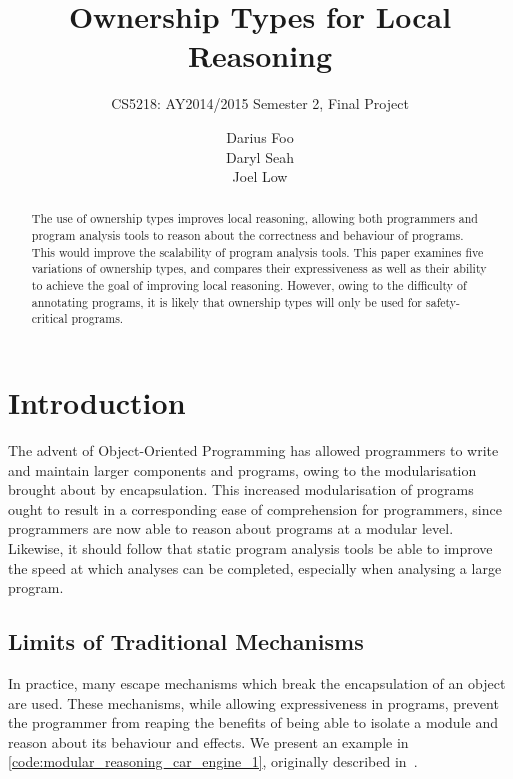 \documentclass{acm_proc_article-sp}
\begin{document}
\title{Ownership Types for Local Reasoning}
\subtitle{CS5218: AY2014/2015 Semester 2, Final Project}


\author{
\alignauthor
Darius Foo\\
\alignauthor
Daryl Seah\\
\alignauthor
Joel Low\\
}



\maketitle
\begin{abstract}
The use of ownership types improves local reasoning, allowing both programmers 
and program analysis tools to reason about the correctness and behaviour of 
programs. This would improve the scalability of program analysis tools. This 
paper examines five variations of ownership types, and compares their 
expressiveness as well as their ability to ach\-ieve the goal of improving 
local reasoning. However, owing to the difficulty of annotating programs, it is 
likely that ownership types will only be used for safety-critical programs.
\end{abstract}

\section{Introduction}
\label{sec:introduction}

The advent of Object-Oriented Programming has allowed programmers to write and 
maintain larger components and programs, owing to the modularisation brought 
about by encapsulation. This increased modularisation of programs ought to 
result in a corresponding ease of comprehension for programmers, since 
programmers are now able to reason about programs at a modular level. 
Likewise, it should follow that static program analysis tools be able to 
improve the speed at which analyses can be completed, especially when analysing 
a large program.

\subsection{Limits of Traditional Mechanisms}
\label{subsec:traditional_mechanism_limits}
In practice, many escape mechanisms which break the encapsulation of an object 
are used. These mechanisms, while allowing expressiveness in programs, prevent 
the programmer from reaping the benefits of being able to isolate a module and 
reason about its behaviour and effects. We present an example in 
\cref{code:modular_reasoning_car_engine_1}, originally 
described in~\cite{clarke98ownership}.
\end{document}
